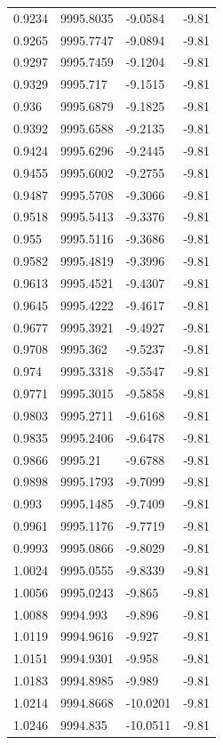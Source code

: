 \begin{table}[H]
\begin{tabular}{llll}
0.9234 & 9995.8035 & -9.0584 & -9.81 \\
0.9265 & 9995.7747 & -9.0894 & -9.81 \\
0.9297 & 9995.7459 & -9.1204 & -9.81 \\
0.9329 & 9995.717 & -9.1515 & -9.81 \\
0.936 & 9995.6879 & -9.1825 & -9.81 \\
0.9392 & 9995.6588 & -9.2135 & -9.81 \\
0.9424 & 9995.6296 & -9.2445 & -9.81 \\
0.9455 & 9995.6002 & -9.2755 & -9.81 \\
0.9487 & 9995.5708 & -9.3066 & -9.81 \\
0.9518 & 9995.5413 & -9.3376 & -9.81 \\
0.955 & 9995.5116 & -9.3686 & -9.81 \\
0.9582 & 9995.4819 & -9.3996 & -9.81 \\
0.9613 & 9995.4521 & -9.4307 & -9.81 \\
0.9645 & 9995.4222 & -9.4617 & -9.81 \\
0.9677 & 9995.3921 & -9.4927 & -9.81 \\
0.9708 & 9995.362 & -9.5237 & -9.81 \\
0.974 & 9995.3318 & -9.5547 & -9.81 \\
0.9771 & 9995.3015 & -9.5858 & -9.81 \\
0.9803 & 9995.2711 & -9.6168 & -9.81 \\
0.9835 & 9995.2406 & -9.6478 & -9.81 \\
0.9866 & 9995.21 & -9.6788 & -9.81 \\
0.9898 & 9995.1793 & -9.7099 & -9.81 \\
0.993 & 9995.1485 & -9.7409 & -9.81 \\
0.9961 & 9995.1176 & -9.7719 & -9.81 \\
0.9993 & 9995.0866 & -9.8029 & -9.81 \\
1.0024 & 9995.0555 & -9.8339 & -9.81 \\
1.0056 & 9995.0243 & -9.865 & -9.81 \\
1.0088 & 9994.993 & -9.896 & -9.81 \\
1.0119 & 9994.9616 & -9.927 & -9.81 \\
1.0151 & 9994.9301 & -9.958 & -9.81 \\
1.0183 & 9994.8985 & -9.989 & -9.81 \\
1.0214 & 9994.8668 & -10.0201 & -9.81 \\
1.0246 & 9994.835 & -10.0511 & -9.81 \\

\end{tabular}
\end{table}
